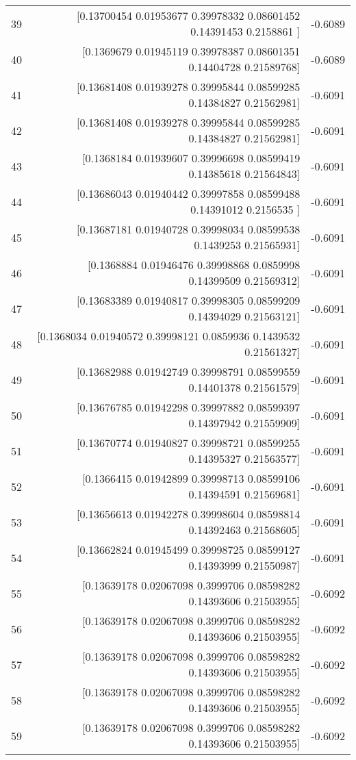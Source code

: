 \begin{longtable}{lrr}
39 & [0.13700454 0.01953677 0.39978332 0.08601452 0.14391453 0.2158861 ] & -0.6089 \\
40 & [0.1369679  0.01945119 0.39978387 0.08601351 0.14404728 0.21589768] & -0.6089 \\
41 & [0.13681408 0.01939278 0.39995844 0.08599285 0.14384827 0.21562981] & -0.6091 \\
42 & [0.13681408 0.01939278 0.39995844 0.08599285 0.14384827 0.21562981] & -0.6091 \\
43 & [0.1368184  0.01939607 0.39996698 0.08599419 0.14385618 0.21564843] & -0.6091 \\
44 & [0.13686043 0.01940442 0.39997858 0.08599488 0.14391012 0.2156535 ] & -0.6091 \\
45 & [0.13687181 0.01940728 0.39998034 0.08599538 0.1439253  0.21565931] & -0.6091 \\
46 & [0.1368884  0.01946476 0.39998868 0.0859998  0.14399509 0.21569312] & -0.6091 \\
47 & [0.13683389 0.01940817 0.39998305 0.08599209 0.14394029 0.21563121] & -0.6091 \\
48 & [0.1368034  0.01940572 0.39998121 0.0859936  0.1439532  0.21561327] & -0.6091 \\
49 & [0.13682988 0.01942749 0.39998791 0.08599559 0.14401378 0.21561579] & -0.6091 \\
50 & [0.13676785 0.01942298 0.39997882 0.08599397 0.14397942 0.21559909] & -0.6091 \\
51 & [0.13670774 0.01940827 0.39998721 0.08599255 0.14395327 0.21563577] & -0.6091 \\
52 & [0.1366415  0.01942899 0.39998713 0.08599106 0.14394591 0.21569681] & -0.6091 \\
53 & [0.13656613 0.01942278 0.39998604 0.08598814 0.14392463 0.21568605] & -0.6091 \\
54 & [0.13662824 0.01945499 0.39998725 0.08599127 0.14393999 0.21550987] & -0.6091 \\
55 & [0.13639178 0.02067098 0.3999706  0.08598282 0.14393606 0.21503955] & -0.6092 \\
56 & [0.13639178 0.02067098 0.3999706  0.08598282 0.14393606 0.21503955] & -0.6092 \\
57 & [0.13639178 0.02067098 0.3999706  0.08598282 0.14393606 0.21503955] & -0.6092 \\
58 & [0.13639178 0.02067098 0.3999706  0.08598282 0.14393606 0.21503955] & -0.6092 \\
59 & [0.13639178 0.02067098 0.3999706  0.08598282 0.14393606 0.21503955] & -0.6092 \\

\end{longtable}
